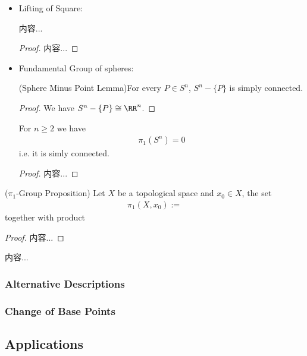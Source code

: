 \documentclass[Total.tex]{subfiles}
\begin{document}
\begin{itemize}
\begin{proof}
		\end{proof}
		\item Lifting of Square:
		\begin{lemma}
			内容...
		\end{lemma}
		\begin{proof}
			内容...
		\end{proof}
		\item Fundamental Group of spheres:
		\begin{lemma}
			(Sphere Minus Point Lemma)For every $P\in S^n$, $S^n-\{P\}$ is simply connected.
		\end{lemma}
		\begin{proof}
			We have $S^n-\{P\}\cong \RR^n$. 
		\end{proof}
		\begin{proposition}
			For $n\geq 2$ we have
			\begin{gather*}
				\pi_1(S^n)=0
			\end{gather*}
			i.e. it is simly connected.
		\end{proposition}
		\begin{proof}
			内容...
		\end{proof}
		
	\end{itemize}
	
	\begin{proposition}
		($\pi_1$-Group Proposition) Let $X$ be a topological space and $x_0\in X$, the set
		\begin{gather*}
			\pi_1(X,x_0):=
		\end{gather*}
		together with product
	\end{proposition}
	\begin{proof}
		内容...
	\end{proof}
	
	\begin{Def}
		内容...
	\end{Def}
	\subsubsection{Alternative Descriptions}
	
	\subsubsection{Change of Base Points}
	\subsection{Applications}
\end{document}
